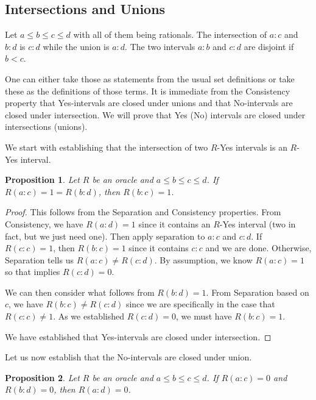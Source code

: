 \documentclass[12pt]{article}
\newtheorem{proposition}{Proposition}
\theoremstyle{remark}
\begin{document}
\subsection{Intersections and Unions}

Let $a \leq b \leq c \leq d$ with all of them being rationals. The intersection of $a:c$ and $b:d$ is $c:d$ while the union is $a:d$. The two intervals $a:b$ and $c:d$ are disjoint if $b < c$. 

One can either take those as statements from the usual set definitions or take these as the definitions of those terms. It is immediate from the Consistency property that Yes-intervals are closed under unions and that No-intervals are closed under intersection. We will prove that Yes (No) intervals are closed under intersections (unions). 

We start with establishing that the intersection of two $R$-Yes intervals is an $R$-Yes interval.

\begin{proposition}\label{pr:inter}
Let $R$ be an oracle and $a \leq b \leq c \leq d$. If $R(a:c) = 1 = R(b:d)$, then $R(b:c) = 1$.
\end{proposition}

\begin{proof}
  
  This follows from the Separation and Consistency properties. From Consistency, we have $R(a:d) = 1$ since it contains an $R$-Yes interval (two in fact, but we just need one). Then apply separation to $a:c$ and $c:d$. If $R(c:c) = 1$, then $R(b:c) = 1$ since it contains $c:c$ and we are done. Otherwise, Separation tells us $R(a:c) \neq R(c:d)$. By assumption, we know $R(a:c) = 1$ so that implies $R(c:d) = 0$. 
  
  We can then consider what follows from $R(b:d) = 1$.  From Separation based on $c$, we have $R(b:c) \neq R(c:d)$ since we are specifically in the case that $R(c:c) \neq 1$. As we established $R(c:d) = 0$, we must have $R(b:c) = 1$.
  
  We have established that Yes-intervals are closed under intersection. 
\end{proof}

Let us now establish that the No-intervals are closed under union. 

\begin{proposition}\label{pr:union}
Let $R$ be an oracle and $a \leq b \leq c \leq d$.  If $R(a:c) = 0$ and $R(b:d) = 0$, then $R(a:d) = 0$. 
\end{proposition}
\end{document}

